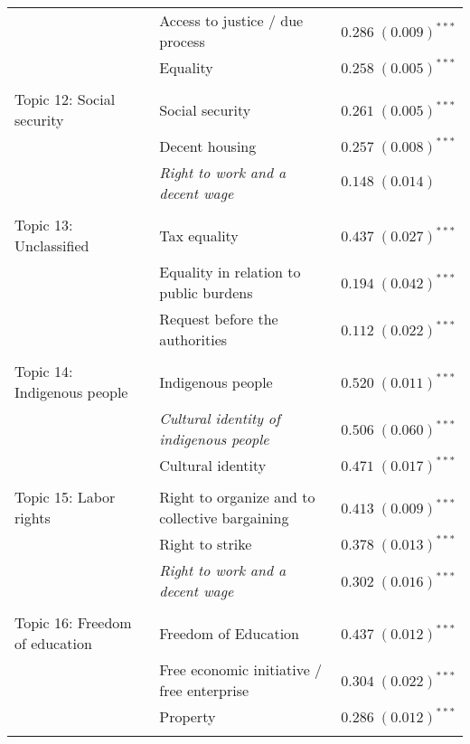 \documentclass[onecolumn]{article}
\begin{document}
\begin{table}
\begin{center}
\begin{tabular}{l l l }
& Access to justice / due process                      & $0.286 \; (0.009)^{***}$ \\
& Equality                                        & $0.258 \; (0.005)^{***}$ \\
\hline \\[-1.8ex]
Topic 12: Social security & Social security                                  & $0.261 \; (0.005)^{***}$ \\
& Decent housing                                   & $0.257 \; (0.008)^{***}$ \\
& \textit{Right to work and a decent wage}                  & $0.148 \; (0.014)$       \\
\hline \\[-1.8ex]
Topic 13: Unclassified & Tax equality                                         & $0.437 \; (0.027)^{***}$ \\
& Equality in relation to public burdens               & $0.194 \; (0.042)^{***}$ \\
& Request before the authorities                       & $0.112 \; (0.022)^{***}$ \\
\hline \\[-1.8ex]
Topic 14: Indigenous people & Indigenous people                                    & $0.520 \; (0.011)^{***}$ \\
& \textit{Cultural identity of indigenous people}               & $0.506 \; (0.060)^{***}$ \\
& Cultural identity                                    & $0.471 \; (0.017)^{***}$ \\
\hline \\[-1.8ex]
Topic 15: Labor rights & Right to organize and to collective bargaining       & $0.413 \; (0.009)^{***}$ \\
& Right to strike                                      & $0.378 \; (0.013)^{***}$ \\
& \textit{Right to work and a decent wage}                  & $0.302 \; (0.016)^{***}$ \\
\hline \\[-1.8ex]
Topic 16: Freedom of education & Freedom of Education                              & $0.437 \; (0.012)^{***}$ \\
& Free economic initiative / free enterprise        & $0.304 \; (0.022)^{***}$ \\
& Property                                         & $0.286 \; (0.012)^{***}$ \\
\hline \\[-1.8ex]

\end{tabular}
\end{center}
\end{table}
\end{document}
